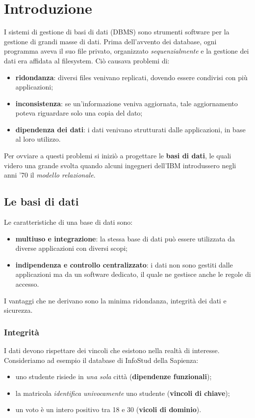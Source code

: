 \section{Introduzione}
I sistemi di gestione di basi di dati (DBMS) sono strumenti software per la gestione
di grandi masse di dati. Prima dell'avvento dei database, ogni programma aveva il suo
file privato, organizzato \emph{sequenzialmente} e la gestione dei dati era affidata
al filesystem. Ci\`o causava problemi di:

\begin{itemize}
 \item \textbf{ridondanza}: diversi files venivano replicati, dovendo essere condivisi
 con pi\`u applicazioni;
 \item \textbf{inconsistenza}: se un'informazione veniva aggiornata, tale aggiornamento 
 poteva riguardare solo una copia del dato;
 \item \textbf{dipendenza dei dati}: i dati venivano strutturati dalle applicazioni, in
 base al loro utilizzo.
\end{itemize}

Per ovviare a questi problemi si inizi\`o a progettare le \textbf{basi di dati}, le quali
videro una grande svolta quando alcuni ingegneri dell'IBM introdussero negli anni '70 il
\emph{modello relazionale}.

  \subsection{Le basi di dati}
  Le caratteristiche di una base di dati sono:
  \begin{itemize}
   \item \textbf{multiuso e integrazione}: la stessa base di dati pu\`o essere utilizzata 
   da diverse applicazioni con diversi scopi;
   \item \textbf{indipendenza e controllo centralizzato}: i dati non sono gestiti dalle
   applicazioni ma da un software dedicato, il quale ne gestisce anche le regole di 
   accesso.
  \end{itemize}
 I vantaggi che ne derivano sono la minima ridondanza, integrità dei dati e sicurezza.
 
 \subsubsection{Integrità}
 I dati devono rispettare dei vincoli che esistono nella realtà di interesse. Consideriamo
 ad esempio il database di InfoStud della Sapienza:
 \begin{itemize}
  \item uno studente risiede in \emph{una sola} città (\textbf{dipendenze funzionali});
  \item la matricola \emph{identifica univocamente} uno studente (\textbf{vincoli di chiave});
  \item un voto è un intero positivo tra 18 e 30 (\textbf{vicoli di dominio}). 
 \end{itemize}
 
